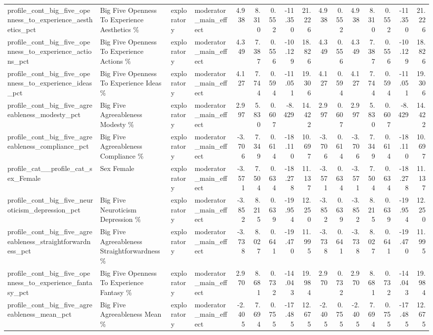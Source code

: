 \begin{table}[htbp]
{{\begin{tabular}{llllrrrrrrrrrrrr}
profile\_cont\_big\_five\_openness\_to\_experience\_aesthetics\_pct & Big Five Openness To Experience Aesthetics \% & exploratory & moderator\_main\_effect & 4.938 & 8.310 & 0.552 & -11.350 & 21.226 & 4.938 & 0.552 & 4.938 & 8.310 & 0.552 & -11.350 & 21.226 \\
profile\_cont\_big\_five\_openness\_to\_experience\_actions\_pct & Big Five Openness To Experience Actions \% & exploratory & moderator\_main\_effect & 4.349 & 7.387 & 0.556 & -10.129 & 18.826 & 4.349 & 0.556 & 4.349 & 7.387 & 0.556 & -10.129 & 18.826 \\
profile\_cont\_big\_five\_openness\_to\_experience\_ideas\_pct & Big Five Openness To Experience Ideas \% & exploratory & moderator\_main\_effect & 4.127 & 7.744 & 0.594 & -11.051 & 19.306 & 4.127 & 0.594 & 4.127 & 7.744 & 0.594 & -11.051 & 19.306 \\
profile\_cont\_big\_five\_agreeableness\_modesty\_pct & Big Five Agreeableness Modesty \% & exploratory & moderator\_main\_effect & 2.997 & 5.830 & 0.607 & -8.429 & 14.422 & 2.997 & 0.607 & 2.997 & 5.830 & 0.607 & -8.429 & 14.422 \\
profile\_cont\_big\_five\_agreeableness\_compliance\_pct & Big Five Agreeableness Compliance \% & exploratory & moderator\_main\_effect & -3.706 & 7.349 & 0.614 & -18.110 & 10.697 & -3.706 & 0.614 & -3.706 & 7.349 & 0.614 & -18.110 & 10.697 \\
profile\_cat\_\_profile\_cat\_sex\_Female & Sex Female & exploratory & moderator\_main\_effect & -3.571 & 7.504 & 0.634 & -18.278 & 11.137 & -3.571 & 0.634 & -3.571 & 7.504 & 0.634 & -18.278 & 11.137 \\
profile\_cont\_big\_five\_neuroticism\_depression\_pct & Big Five Neuroticism Depression \% & exploratory & moderator\_main\_effect & -3.852 & 8.215 & 0.639 & -19.954 & 12.250 & -3.852 & 0.639 & -3.852 & 8.215 & 0.639 & -19.954 & 12.250 \\
profile\_cont\_big\_five\_agreeableness\_straightforwardness\_pct & Big Five Agreeableness Straightforwardness \% & exploratory & moderator\_main\_effect & -3.738 & 8.027 & 0.641 & -19.470 & 11.995 & -3.738 & 0.641 & -3.738 & 8.027 & 0.641 & -19.470 & 11.995 \\
profile\_cont\_big\_five\_openness\_to\_experience\_fantasy\_pct & Big Five Openness To Experience Fantasy \% & exploratory & moderator\_main\_effect & 2.970 & 8.681 & 0.732 & -14.043 & 19.984 & 2.970 & 0.732 & 2.970 & 8.681 & 0.732 & -14.043 & 19.984 \\
profile\_cont\_big\_five\_agreeableness\_mean\_pct & Big Five Agreeableness Mean \% & exploratory & moderator\_main\_effect & -2.405 & 7.694 & 0.755 & -17.485 & 12.675 & -2.405 & 0.755 & -2.405 & 7.694 & 0.755 & -17.485 & 12.675 \\

\end{tabular}}}
\end{table}
